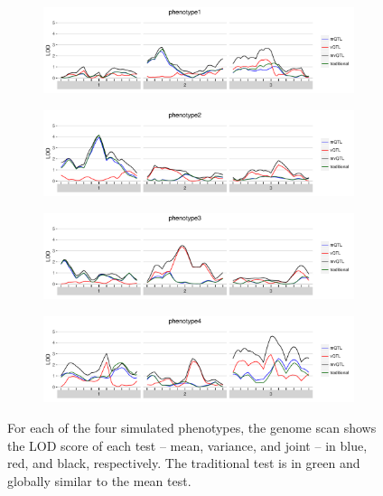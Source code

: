 \documentclass{article}
\begin{document}
\begin{figure}[t]
    \begin{subfigure}[b]{0.9\textwidth}
        \includegraphics[width=\textwidth]{images/LOD_scan_phenotype1.pdf}
    \end{subfigure}
    \begin{subfigure}[b]{0.9\textwidth}
        \includegraphics[width=\textwidth]{images/LOD_scan_phenotype2.pdf}
    \end{subfigure}
    \begin{subfigure}[b]{0.9\textwidth}
        \includegraphics[width=\textwidth]{images/LOD_scan_phenotype3.pdf}
    \end{subfigure}
    \begin{subfigure}[b]{0.9\textwidth}
        \includegraphics[width=\textwidth]{images/LOD_scan_phenotype4.pdf}
    \end{subfigure}
    \caption{For each of the four simulated phenotypes, the genome scan shows the LOD score of each test -- mean, variance, and joint -- in blue, red, and black, respectively.  The traditional test is in green and globally similar to the mean test. \label{fig:lod_score_scans}}
\end{figure}
\end{document}
